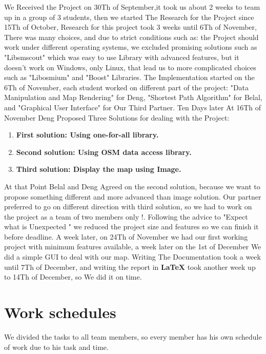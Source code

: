\documentclass[a4paper, 12pt, english]{book}
\begin{document}
We Received the Project on 30Th of September,it took us about 2 weeks to 
team up in a group of 3 students, then we started The Research for the 
Project since 15Th of October, Research for this project took 3 weeks 
until 6Th of November, There was many choices, and due to strict conditions such as: the Project should work under different operating systems, we excluded promising solutions such as "Libsmscout" which was easy to use Library with advanced features, but it doesn't work on Windows, only Linux, that lead us to more complicated choices such as "Libosmium" and "Boost" Libraries.
The Implementation started on the 6Th of November, each student worked on different part of the project: "Data Manipulation and Map Rendering" for Deng, "Shortest Path Algorithm" for Belal, and "Graphical User Interface" for Our Third Partner.
Ten Days later At 16Th of November Deng Proposed Three Solutions for dealing with the Project:
\begin{enumerate}
\item {\textbf{ First solution: Using one-for-all library.}}
\item{\textbf{Second solution: Using OSM data access library.}}
\item{\textbf{Third solution: Display the map using Image.}}
\end{enumerate}
At that Point Belal and Deng Agreed on the second solution, because we want to propose something different and more advanced than image solution.
Our partner preferred to go on different direction with third solution, so we had to work on the project as a team of two members only !.
Following the advice to "Expect what is Unexpected " we reduced the project size and features so we can finish it before deadline.
A week later, on 24Th of November we had our first working project with minimum features available, a week later on the 1st of December We did a simple GUI to deal with our map.
Writing The Documentation took a week until 7Th of December, and writing the report in \textbf{\LaTeX} \space took another week up to 14Th of December, so We did it on time.

\section{Work schedules}
We divided the tasks to all team members, so every member has his own schedule of work due to his task and time.
\end{document}
